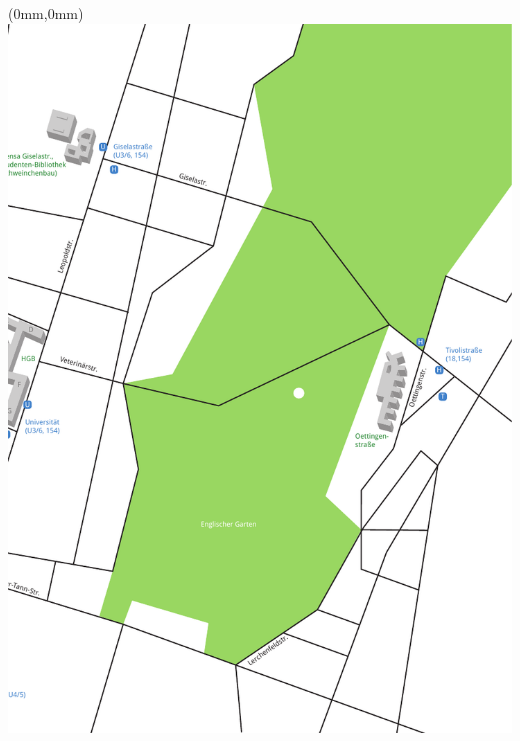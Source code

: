 \documentclass[twoside,12pt,parskip=half-]{scrartcl}
\begin{document}
\thispagestyle{empty}
\begin{textblock*}{\paperwidth}(0mm,0mm)
   \noindent\includegraphics[width=\paperwidth,height=\paperheight]{lageplan_rechts}
\end{textblock*}
\mbox{}


\clearpage
\end{document}
